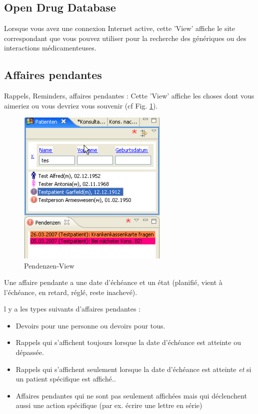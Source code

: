\subsection{Open Drug Database}
Lorsque vous avez une connexion Internet active, cette 'View' affiche  le site correspondant que vous pouvez utiliser pour la recherche des génériques ou des interactions médicamenteuses.

\subsection{Affaires pendantes}
Rappels, Reminders, affaires pendantes : Cette 'View' affiche les choses dont vous aimeriez ou vous devriez vous souvenir (cf Fig. \ref{fig:pendenzen}).

\begin{figure}
  \includegraphics[width=7.2cm]{images/pendenzenview}
  \caption{Pendenzen-View}
  \label{fig:pendenzen}
\end{figure}

Une affaire pendante a une date d'échéance et un état (planifié, vient à l'échéance, en retard, réglé, reste inachevé).

l y a les types suivants d'affaires pendantes :
\begin{itemize}
  \item Devoirs pour une personne ou devoirs pour tous.
  \item Rappels qui s'affichent toujours lorsque la date d'échéance est atteinte ou dépassée. 
  \item Rappels qui s'affichent seulement lorsque la date d'échéance est atteinte 
  \textit{et} si un patient spécifique est affiché..
  \item Affaires pendantes qui ne sont pas seulement affichées mais qui déclenchent aussi une action spécifique (par ex. écrire une lettre en série)
\end{itemize}

